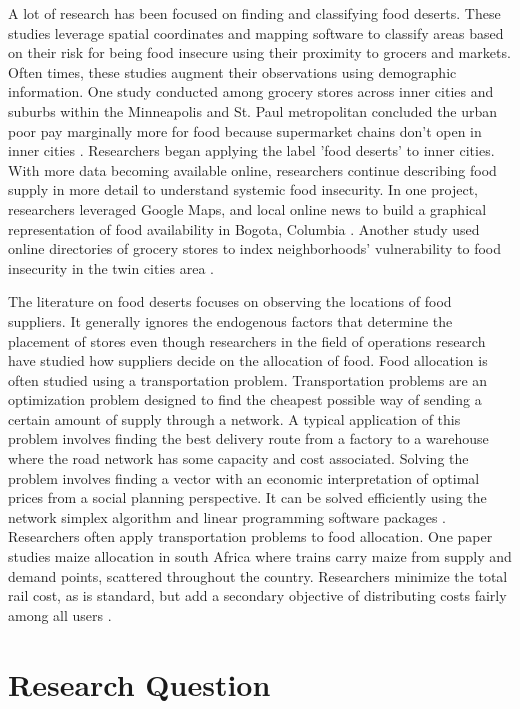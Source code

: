 \documentclass{report}
\begin{document}
A lot of research has been focused on finding and classifying food deserts. These studies leverage spatial coordinates and mapping software to classify areas based on their risk for being food insecure using their proximity to grocers and markets. Often times, these studies augment their observations using demographic information.  One study conducted among grocery stores across inner cities and suburbs within the Minneapolis and St. Paul metropolitan concluded the urban poor pay marginally more for food because supermarket chains don't open in inner cities \cite{Chung}. Researchers began applying the label 'food deserts' to inner cities. With more data becoming available online, researchers continue describing food supply in more detail to understand systemic food insecurity. In one project, researchers leveraged Google Maps, and local online news to build a graphical representation of food availability in Bogota, Columbia \cite{Hwang}. Another study used online directories of grocery stores to index neighborhoods' vulnerability to food insecurity in the twin cities area \cite{Larson}.

The literature on food deserts focuses on observing the locations of food suppliers. It generally ignores the endogenous factors that determine the placement of stores even though researchers in the field of operations research have studied how suppliers decide on the allocation of food. Food allocation is often studied using a transportation problem. Transportation problems are an optimization problem designed to find the cheapest possible way of sending a certain amount of supply through a network. A typical application of this problem involves finding the best delivery route from a factory to a warehouse where the road network has some capacity and cost associated. Solving the problem involves finding a vector with an economic interpretation of optimal prices from a social planning perspective. It can be solved efficiently using the network simplex algorithm and linear programming software packages \cite{Cook}. Researchers often apply transportation problems to food allocation. One paper studies maize allocation in south Africa where trains carry maize from supply and demand points, scattered throughout the country. Researchers minimize the total rail cost, as is standard, but add a secondary objective of distributing costs fairly among all users \cite{Stewart}.

\section{Research Question} 
\end{document}
